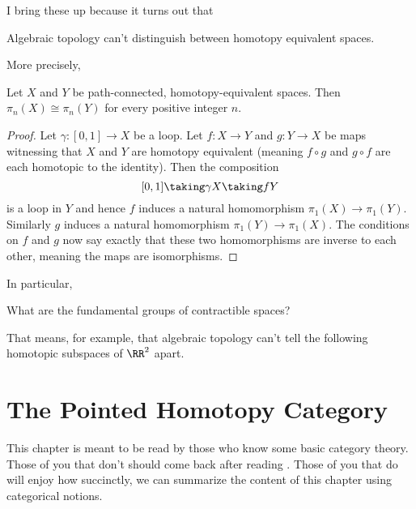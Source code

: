 I bring these up because it turns out that 
\begin{moral}
	Algebraic topology can't distinguish between homotopy equivalent spaces.
\end{moral}
More precisely,
\begin{theorem}
	\label{thm:fundgrp_homotopy_invariant}
	Let $X$ and $Y$ be path-connected, homotopy-equivalent spaces.
	Then $\pi_n(X) \cong \pi_n(Y)$ for every positive integer $n$.
\end{theorem}
\begin{proof}
	Let $\gamma : [0,1] \to X$ be a loop.
	Let $f : X \to Y$ and $g : Y \to X$ be maps witnessing that $X$ and $Y$ are homotopy equivalent
	(meaning $f \circ g$ and $g \circ f$ are each homotopic to the identity).
	Then the composition
	\[ [0,1] \taking\gamma X \taking f Y \]
	is a loop in $Y$ and hence $f$ induces a natural homomorphism $\pi_1(X) \to \pi_1(Y)$.
	Similarly $g$ induces a natural homomorphism $\pi_1(Y) \to \pi_1(X)$.
	The conditions on $f$ and $g$ now say exactly that these two homomorphisms
	are inverse to each other, meaning the maps are isomorphisms.
\end{proof}
In particular,
\begin{ques}
	What are the fundamental groups of contractible spaces?
\end{ques}

That means, for example, that algebraic topology can't tell the following homotopic subspaces of $\RR^2$ apart.
\begin{center}
	{\color{red} \Huge \venus}
	\qquad
	{\color{blue} \Huge \mars}
\end{center}

\section{The Pointed Homotopy Category}
This chapter is meant to be read by those who know some basic category theory.
Those of you that don't should come back after reading .
Those of you that do will enjoy how succinctly, we can summarize
the content of this chapter using categorical notions.

